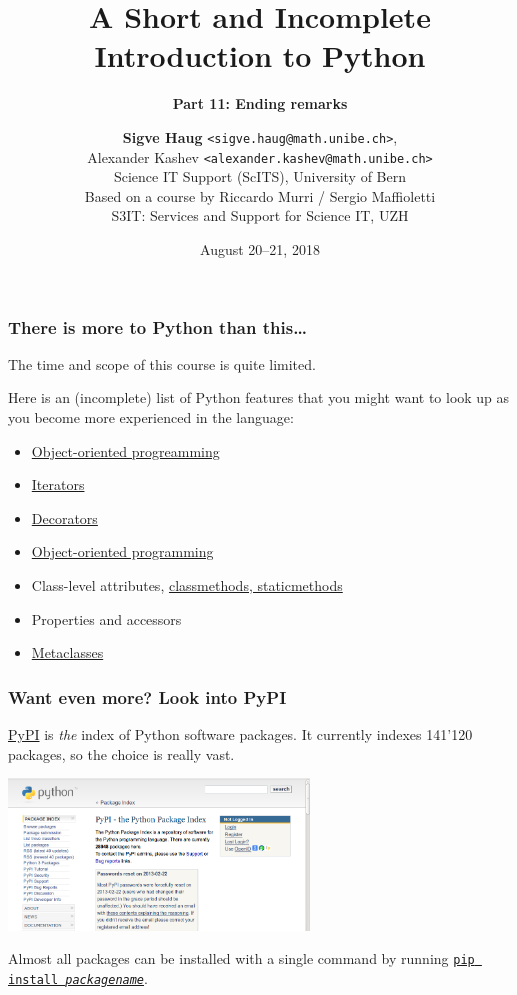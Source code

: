 \documentclass[english,serif,mathserif,xcolor=pdftex,dvipsnames,table]{beamer}
\title[Introduction to Python]{%
  A Short and Incomplete Introduction to Python
}
\subtitle{\bfseries Part 11: Ending remarks}
\author[S.~Haug]{%
  \textbf{Sigve Haug} \texttt{<sigve.haug@math.unibe.ch>}, \\
  Alexander Kashev \texttt{<alexander.kashev@math.unibe.ch>} \\
  Science IT Support (ScITS), University of Bern \\
  \medskip
  Based on a course by Riccardo Murri / Sergio Maffioletti
  \\
  S3IT: Services and Support for Science IT, UZH
}
\date{August 20--21, 2018}
\begin{document}
\maketitle



\begin{frame}
  \frametitle{There is more to Python than this\ldots}

  The time and scope of this course is quite limited.

  \+
  Here is an (incomplete) list of Python features that you might
  want to look up as you become more experienced in the language:
  \begin{itemize}
    \item \href{https://github.com/gc3-uzh-ch/python-course}{Object-oriented progreamming}
  \item
    \href{http://docs.python.org/2/tutorial/classes.html\#iterators}{Iterators}
  \item
    \href{http://www.artima.com/weblogs/viewpost.jsp?thread=240808}{Decorators}
  \item \href{https://github.com/gc3-uzh-ch/python-course}{Object-oriented programming}
  \item Class-level attributes, \href{http://stackoverflow.com/a/12179752/1808780}{classmethods, staticmethods}
  \item Properties and accessors
  \item \href{http://stackoverflow.com/a/6581949/459543}{Metaclasses}
  \end{itemize}
\end{frame}


\begin{frame}
  \frametitle{Want even more? Look into PyPI}
  \small

  \href{http://pypi.python.org}{PyPI} is \emph{the} index of Python software packages.
  It currently indexes 141'120 packages, so the choice is really vast.

  \begin{center}
    \includegraphics[width=0.60\textwidth]{fig/pypi_screenshot.png}
  \end{center}

  Almost all packages can be installed with a single command by
  running \href{https://pypi.python.org/pypi/pip}{\texttt{pip install
    \emph{packagename}}}.

\end{frame}
\end{document}
